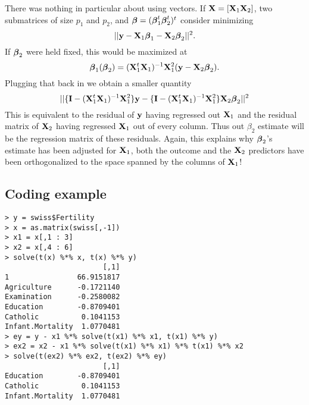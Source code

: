 There was nothing in particular about using vectors.
If $\mathbf{X} = [\mathbf{X}_1 \mathbf{X}_2]$, two submatrices of size
$p_1$ and $p_2$, and $\boldsymbol{\beta} = (\boldsymbol{\beta}_1^t \boldsymbol{\beta}_2^t)^t$ consider minimizing  
$$
|| \mathbf{y} - \mathbf{X}_1 \boldsymbol{\beta}_1 - \mathbf{X}_2 \boldsymbol{\beta}_2||^2.
$$
If $\boldsymbol{\beta}_2$ were held fixed, this would be maximized
at 
$$
\boldsymbol{\beta}_1(\boldsymbol{\beta}_2) = 
(\mathbf{X}_1^t \mathbf{X}_1)^{-1} \mathbf{X}_1^2 (\mathbf{y} - \mathbf{X}_2 \boldsymbol{\beta}_2).
$$
Plugging that back in we obtain a smaller quantity
$$
||\{\mathbf{I} - (\mathbf{X}_1^t \mathbf{X}_1)^{-1} \mathbf{X}_1^2\} \mathbf{y}
- \{\mathbf{I} - (\mathbf{X}_1^t \mathbf{X}_1)^{-1} \mathbf{X}_1^2 \}\mathbf{X}_2 \boldsymbol{\beta}_2
||^2
$$
This is equivalent to the residual of $\mathbf{y}$ having
regressed out $\mathbf{X}_1$ and the residual matrix of
$\mathbf{X}_2$ having regressed $\mathbf{X}_1$ out of every column.
Thus out $\beta_2$ estimate will be the regression
matrix of these residuals. Again, this explains
why $\boldsymbol{\beta}_2$'s estimate has been adjusted for
$\mathbf{X}_1$, both the outcome and the $\mathbf{X}_2$ predictors
have been orthogonalized to the space spanned
by the columns of $\mathbf{X}_1$!


\subsection{Coding example}
\begin{verbatim}
> y = swiss$Fertility
> x = as.matrix(swiss[,-1])
> x1 = x[,1 : 3]
> x2 = x[,4 : 6]
> solve(t(x) %*% x, t(x) %*% y)
                       [,1]
1                66.9151817
Agriculture      -0.1721140
Examination      -0.2580082
Education        -0.8709401
Catholic          0.1041153
Infant.Mortality  1.0770481
> ey = y - x1 %*% solve(t(x1) %*% x1, t(x1) %*% y)
> ex2 = x2 - x1 %*% solve(t(x1) %*% x1) %*% t(x1) %*% x2
> solve(t(ex2) %*% ex2, t(ex2) %*% ey)
                       [,1]
Education        -0.8709401
Catholic          0.1041153
Infant.Mortality  1.0770481
\end{verbatim}










